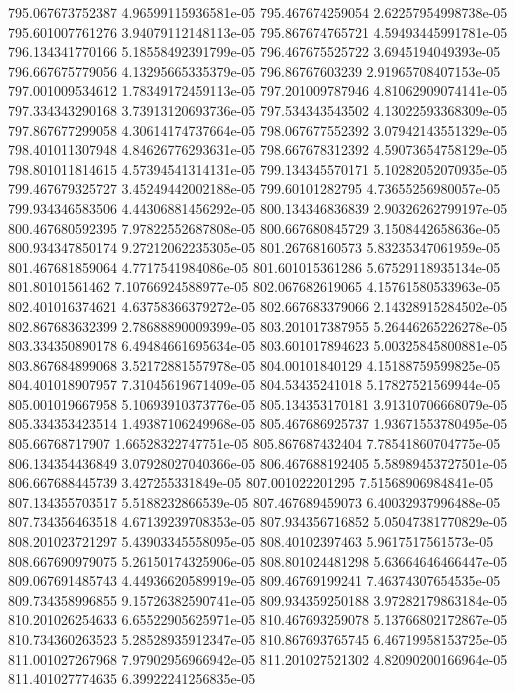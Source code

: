 {795.067673752387 4.96599115936581e-05
795.467674259054 2.62257954998738e-05
795.601007761276 3.94079112148113e-05
795.867674765721 4.59493445991781e-05
796.134341770166 5.18558492391799e-05
796.467675525722 3.6945194049393e-05
796.667675779056 4.13295665335379e-05
796.86767603239 2.91965708407153e-05
797.001009534612 1.78349172459113e-05
797.201009787946 4.81062909074141e-05
797.334343290168 3.73913120693736e-05
797.534343543502 4.13022593368309e-05
797.867677299058 4.30614174737664e-05
798.067677552392 3.07942143551329e-05
798.401011307948 4.84626776293631e-05
798.667678312392 4.59073654758129e-05
798.801011814615 4.57394541314131e-05
799.134345570171 5.10282052070935e-05
799.467679325727 3.45249442002188e-05
799.60101282795 4.73655256980057e-05
799.934346583506 4.44306881456292e-05
800.134346836839 2.90326262799197e-05
800.467680592395 7.97822552687808e-05
800.667680845729 3.1508442658636e-05
800.934347850174 9.27212062235305e-05
801.26768160573 5.83235347061959e-05
801.467681859064 4.7717541984086e-05
801.601015361286 5.67529118935134e-05
801.80101561462 7.10766924588977e-05
802.067682619065 4.15761580533963e-05
802.401016374621 4.63758366379272e-05
802.667683379066 2.14328915284502e-05
802.867683632399 2.78688890009399e-05
803.201017387955 5.26446265226278e-05
803.334350890178 6.49484661695634e-05
803.601017894623 5.00325845800881e-05
803.867684899068 3.52172881557978e-05
804.00101840129 4.15188759599825e-05
804.401018907957 7.31045619671409e-05
804.53435241018 5.17827521569944e-05
805.001019667958 5.10693910373776e-05
805.134353170181 3.91310706668079e-05
805.334353423514 1.49387106249968e-05
805.467686925737 1.93671553780495e-05
805.66768717907 1.66528322747751e-05
805.867687432404 7.78541860704775e-05
806.134354436849 3.07928027040366e-05
806.467688192405 5.58989453727501e-05
806.667688445739 3.427255331849e-05
807.001022201295 7.51568906984841e-05
807.134355703517 5.5188232866539e-05
807.467689459073 6.40032937996488e-05
807.734356463518 4.67139239708353e-05
807.934356716852 5.05047381770829e-05
808.201023721297 5.43903345558095e-05
808.40102397463 5.9617517561573e-05
808.667690979075 5.26150174325906e-05
808.801024481298 5.63664646466447e-05
809.067691485743 4.44936620589919e-05
809.46769199241 7.46374307654535e-05
809.734358996855 9.15726382590741e-05
809.934359250188 3.97282179863184e-05
810.201026254633 6.65522905625971e-05
810.467693259078 5.13766802172867e-05
810.734360263523 5.28528935912347e-05
810.867693765745 6.46719958153725e-05
811.001027267968 7.97902956966942e-05
811.201027521302 4.82090200166964e-05
811.401027774635 6.39922241256835e-05
}
